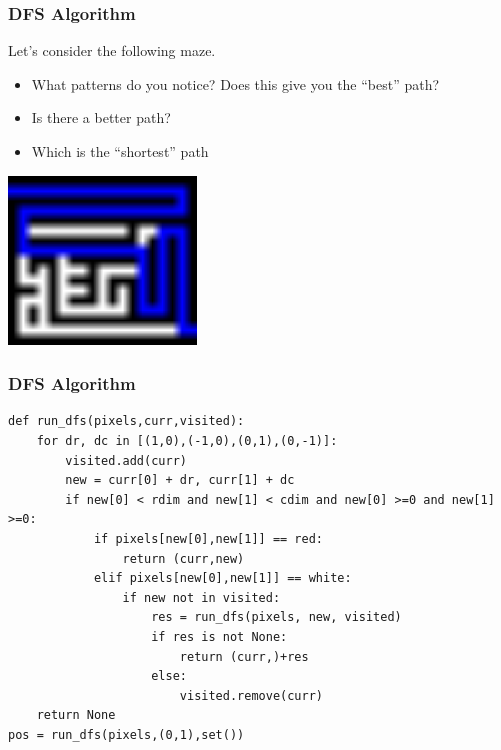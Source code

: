 \documentclass{beamer}
\begin{document}
        \begin{frame}
            \frametitle{DFS Algorithm}
            Let's consider the following maze.
            \begin{itemize}
                \item What patterns do you notice? Does this give you the ``best'' path? 
                \item Is there a better path?
                \item Which is the ``shortest'' path


            \end{itemize}
        
            \includegraphics[width=5cm,scale=2]{../dfs_out.png}
        
            
            \end{frame}

            \begin{frame}[fragile]
                \frametitle{DFS Algorithm}
\begin{lstlisting}
def run_dfs(pixels,curr,visited):
    for dr, dc in [(1,0),(-1,0),(0,1),(0,-1)]:
        visited.add(curr)
        new = curr[0] + dr, curr[1] + dc
        if new[0] < rdim and new[1] < cdim and new[0] >=0 and new[1] >=0:
            if pixels[new[0],new[1]] == red:
                return (curr,new)
            elif pixels[new[0],new[1]] == white:
                if new not in visited:
                    res = run_dfs(pixels, new, visited)
                    if res is not None:
                        return (curr,)+res
                    else:
                        visited.remove(curr)
    return None
pos = run_dfs(pixels,(0,1),set())\end{lstlisting}

            \end{frame}
\end{document}
